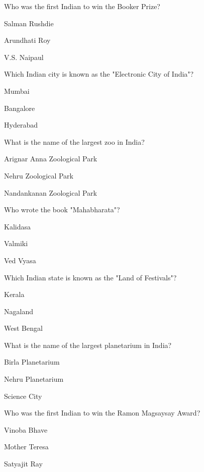\begin{enhancedmcq}{Who was the first Indian to win the Booker Prize?}
\item Salman Rushdie
\item Arundhati Roy
\item V.S. Naipaul

\end{enhancedmcq}
\begin{enhancedmcq}{Which Indian city is known as the "Electronic City of India"?}
\item Mumbai
\item Bangalore
\item Hyderabad

\end{enhancedmcq}
\begin{enhancedmcq}{What is the name of the largest zoo in India?}
\item Arignar Anna Zoological Park
\item Nehru Zoological Park
\item Nandankanan Zoological Park

\end{enhancedmcq}
\begin{enhancedmcq}{Who wrote the book "Mahabharata"?}
\item Kalidasa
\item Valmiki
\item Ved Vyasa

\end{enhancedmcq}
\begin{enhancedmcq}{Which Indian state is known as the "Land of Festivals"?}
\item Kerala
\item Nagaland
\item West Bengal

\end{enhancedmcq}
\begin{enhancedmcq}{What is the name of the largest planetarium in India?}
\item Birla Planetarium
\item Nehru Planetarium
\item Science City

\end{enhancedmcq}
\begin{enhancedmcq}{Who was the first Indian to win the Ramon Magsaysay Award?}
\item Vinoba Bhave
\item Mother Teresa
\item Satyajit Ray

\end{enhancedmcq}
